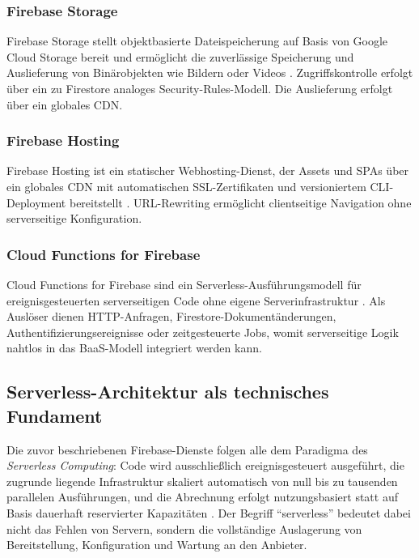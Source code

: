 \subsubsection{Firebase Storage}

Firebase Storage stellt objektbasierte Dateispeicherung auf Basis von Google Cloud Storage bereit und ermöglicht die zuverlässige Speicherung und Auslieferung von Binärobjekten wie Bildern oder Videos \cite{firebase2025}. Zugriffskontrolle erfolgt über ein zu Firestore analoges Security-Rules-Modell. Die Auslieferung erfolgt über ein globales CDN.

\subsubsection{Firebase Hosting}

Firebase Hosting ist ein statischer Webhosting-Dienst, der Assets und SPAs über ein globales CDN mit automatischen SSL-Zertifikaten und versioniertem CLI-Deployment bereitstellt \cite{firebase2025}. URL-Rewriting ermöglicht clientseitige Navigation ohne serverseitige Konfiguration.

\subsubsection{Cloud Functions for Firebase}

Cloud Functions for Firebase sind ein Serverless-Ausführungsmodell für ereignisgesteuerten serverseitigen Code ohne eigene Serverinfrastruktur \cite{firebase2025, kolesnikov2024}. Als Auslöser dienen HTTP-Anfragen, Firestore-Dokumentänderungen, Authentifizierungsereignisse oder zeitgesteuerte Jobs, womit serverseitige Logik nahtlos in das BaaS-Modell integriert werden kann.

\subsection{Serverless-Architektur als technisches Fundament}
\label{subsec:serverless}

Die zuvor beschriebenen Firebase-Dienste folgen alle dem Paradigma des \textit{Serverless Computing}: Code wird ausschließlich ereignisgesteuert ausgeführt, die zugrunde liegende Infrastruktur skaliert automatisch von null bis zu tausenden parallelen Ausführungen, und die Abrechnung erfolgt nutzungsbasiert statt auf Basis dauerhaft reservierter Kapazitäten \cite{newman2021, shafiei2022}. Der Begriff \enquote{serverless} bedeutet dabei nicht das Fehlen von Servern, sondern die vollständige Auslagerung von Bereitstellung, Konfiguration und Wartung an den Anbieter.

